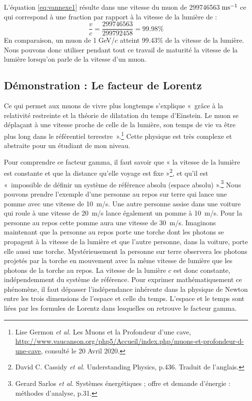 \documentclass[a4paper, 12pt]{article}
\begin{document}
\begin{spacing}{1.5}
L'équation \ref{eq:vannexe1} résulte dans une vitesse du muon de 299746563$\;{\rm ms^{-1}}$ ce qui correspond à une fraction par rapport à la vitesse de la lumière de :
\begin{equation}
\frac{v}{c} = \frac{299746563}{299792458} = 99.98\% \label{eq:v/c}
\end{equation}
En comparaison, un muon de 1$\;$GeV/$c$ atteint 99.43\% de la vitesse de la lumière. Nous pouvons donc utiliser pendant tout ce travail de maturité la vitesse de la lumière lorsqu'on parle de la vitesse d'un muon. 

\subsection{Démonstration : Le facteur de Lorentz}
\label{annexes 2}

Ce qui permet aux muons de vivre plus longtemps s'explique «~grâce à la relativité restreinte et la théorie de dilatation du temps d'Einstein. Le muon se déplaçant à une vitesse proche de celle de la lumière, son temps de vie va être plus long dans le référentiel terrestre~».\footnote{Lise Germon \emph{et al.} Les Muons et la Profondeur d'une cave, \url{http://www.vaucanson.org/php5/Accueil/index.php/muons-et-profondeur-d-une-cave}, consulté le 20 Avril 2020.} Cette physique est très complexe et abstraite pour un étudiant de mon niveau. 

Pour comprendre ce facteur gamma, il faut savoir que « la vitesse de la lumière est constante et que la distance qu'elle voyage est fixe »\footnote{David C. Cassidy \emph{et al.} Understanding Physics, p.436. Traduit de l'anglais.}, et qu'il est «~impossible de définir un système de référence absolu (espace absolu) ».\footnote{Gerard Sarlos \emph{et al.} Systèmes énergétiques ; offre et demande d'énergie : méthodes d'analyse, p.31.} Nous pouvons prendre l'exemple d'une personne au repos sur terre qui lance une pomme avec une vitesse de 10~m/s. Une autre personne assise dans une voiture qui roule à une vitesse de 20~m/s lance également un pomme à 10~m/s. Pour la personne au repos cette pomme aura une vitesse de 30~m/s. Imaginons maintenant que la personne au repos porte une torche dont les photons se propagent à la vitesse de la lumière et que l'autre personne, dans la voiture, porte elle aussi une torche. Mystérieusement la personne sur terre observera les photons projetés par la torche en mouvement avec la même vitesse de lumière que les photons de la torche au repos. La vitesse de la lumière $c$ est donc constante, indépendemment du système de référence. Pour exprimer mathématiquement ce phénomène, il faut dépasser l'indépendance inhérente dans la physique de Newton entre les trois dimensions de l'espace et celle du temps. L'espace et le temps sont liées par les formules de Lorentz dans lesquelles on retrouve le facteur gamma.


\end{spacing}
\end{document}

